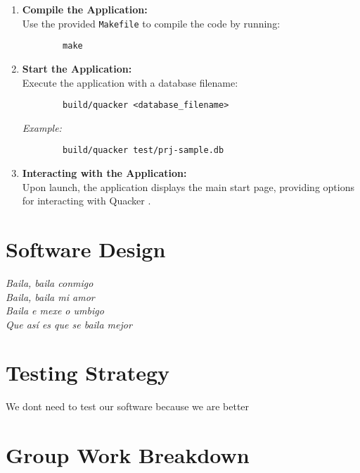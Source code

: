 \documentclass[12pt]{article}
\begin{document}
	\begin{enumerate}
		\item \textbf{Compile the Application:} \\
		Use the provided \texttt{Makefile} to compile the code by running:
		\begin{verbatim}
		make
		\end{verbatim}

		\item \textbf{Start the Application:} \\
		Execute the application with a database filename:
		\begin{verbatim}
		build/quacker <database_filename>
		\end{verbatim}
		\textit{Example:}
		\begin{verbatim}
		build/quacker test/prj-sample.db
		\end{verbatim}

		\item \textbf{Interacting with the Application:} \\
		Upon launch, the application displays the main start page, providing options for interacting with Quacker .
	\end{enumerate}
\newpage

\section{Software Design}
\begin{center}
\textit{
Baila, baila conmigo\\
Baila, baila mi amor\\
Baila e mexe o umbigo\\
Que así es que se baila mejor\\
}
\end{center}
\newpage

\section{Testing Strategy}
We dont need to test our software because we are better
\newpage


\section{Group Work Breakdown}
\end{document}
